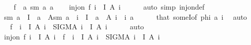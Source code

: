 \begin{isabellebody}
\ \ \isamarkupfalse%
\ {\isacharquery}{\kern0pt}f\ {\isacharequal}{\kern0pt}\ {\isachardoublequoteopen}{\isasymlambda}a{\isachardot}{\kern0pt}\ {\isacharparenleft}{\kern0pt}{\isacharquery}{\kern0pt}sm\ a{\isacharcomma}{\kern0pt}\ a{\isacharparenright}{\kern0pt}{\isachardoublequoteclose}\isanewline
\ \ \isamarkupfalse%
\ {\isachardoublequoteopen}inj{\isacharunderscore}{\kern0pt}on\ {\isacharquery}{\kern0pt}f\ {\isacharparenleft}{\kern0pt}{\isasymUnion}i\ {\isasymin}\ I{\isachardot}{\kern0pt}\ A\ i{\isacharparenright}{\kern0pt}{\isachardoublequoteclose}\isanewline
\ \ \ \ \isamarkupfalse%
\ {\isacharparenleft}{\kern0pt}auto\ simp{\isacharcolon}{\kern0pt}\ inj{\isacharunderscore}{\kern0pt}on{\isacharunderscore}{\kern0pt}def{\isacharparenright}{\kern0pt}\isanewline
\ \ \isamarkupfalse%
\isanewline
\ \ \isamarkupfalse%
\ {\isachardoublequoteopen}{\isacharquery}{\kern0pt}sm\ a\ {\isasymin}\ I\ {\isasymand}\ a\ {\isasymin}\ A{\isacharparenleft}{\kern0pt}{\isacharquery}{\kern0pt}sm\ a{\isacharparenright}{\kern0pt}{\isachardoublequoteclose}\ \ {\isachardoublequoteopen}i\ {\isasymin}\ I{\isachardoublequoteclose}\ \ {\isachardoublequoteopen}a\ {\isasymin}\ A\ i{\isachardoublequoteclose}\ \ i\ a\isanewline
\ \ \ \ \isamarkupfalse%
\ that\ someI{\isacharbrackleft}{\kern0pt}of\ {\isachardoublequoteopen}{\isacharquery}{\kern0pt}phi\ a{\isachardoublequoteclose}\ i{\isacharbrackright}{\kern0pt}\ \isamarkupfalse%
\ auto\isanewline
\ \ \isamarkupfalse%
\ \isamarkupfalse%
\ {\isachardoublequoteopen}{\isacharquery}{\kern0pt}f\ {\isacharbackquote}{\kern0pt}\ {\isacharparenleft}{\kern0pt}{\isasymUnion}i\ {\isasymin}\ I{\isachardot}{\kern0pt}\ A\ i{\isacharparenright}{\kern0pt}\ {\isasymsubseteq}\ {\isacharparenleft}{\kern0pt}SIGMA\ i\ {\isacharcolon}{\kern0pt}\ I{\isachardot}{\kern0pt}\ A\ i{\isacharparenright}{\kern0pt}{\isachardoublequoteclose}\isanewline
\ \ \ \ \isamarkupfalse%
\ auto\isanewline
\ \ \isamarkupfalse%
\ \isamarkupfalse%
\ {\isachardoublequoteopen}inj{\isacharunderscore}{\kern0pt}on\ {\isacharquery}{\kern0pt}f\ {\isacharparenleft}{\kern0pt}{\isasymUnion}i\ {\isasymin}\ I{\isachardot}{\kern0pt}\ A\ i{\isacharparenright}{\kern0pt}\ {\isasymand}\ {\isacharquery}{\kern0pt}f\ {\isacharbackquote}{\kern0pt}\ {\isacharparenleft}{\kern0pt}{\isasymUnion}i\ {\isasymin}\ I{\isachardot}{\kern0pt}\ A\ i{\isacharparenright}{\kern0pt}\ {\isasymsubseteq}\ {\isacharparenleft}{\kern0pt}SIGMA\ i\ {\isacharcolon}{\kern0pt}\ I{\isachardot}{\kern0pt}\ A\ i{\isacharparenright}{\kern0pt}{\isachardoublequoteclose}\isanewline

\end{isabellebody}
